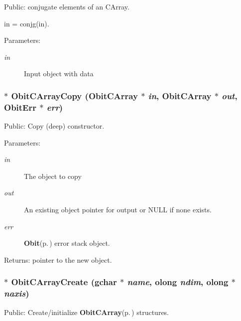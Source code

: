 Public: conjugate elements of an CArray. 

in = conjg(in). \begin{Desc}
\item[Parameters:]
\begin{description}
\item[{\em in}]Input object with data \end{description}
\end{Desc}
\subsubsection{$\ast$ Obit\-CArray\-Copy ({\bf Obit\-CArray} $\ast$ {\em in}, {\bf Obit\-CArray} $\ast$ {\em out}, {\bf Obit\-Err} $\ast$ {\em err})}\label{ObitCArray_8c_a8}


Public: Copy (deep) constructor. 

\begin{Desc}
\item[Parameters:]
\begin{description}
\item[{\em in}]The object to copy \item[{\em out}]An existing object pointer for output or NULL if none exists. \item[{\em err}]{\bf Obit}{\rm (p.\,\pageref{structObit})} error stack object. \end{description}
\end{Desc}
\begin{Desc}
\item[Returns:]pointer to the new object. \end{Desc}
\subsubsection{$\ast$ Obit\-CArray\-Create (gchar $\ast$ {\em name}, {\bf olong} {\em ndim}, {\bf olong} $\ast$ {\em naxis})}\label{ObitCArray_8c_a10}


Public: Create/initialize {\bf Obit\-CArray}{\rm (p.\,\pageref{structObitCArray})} structures. 

